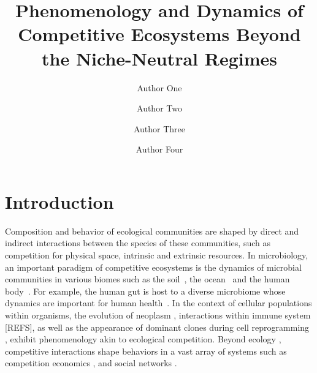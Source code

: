 \documentclass[9pt,twocolumn,twoside,lineno]{pnas-new}
\title{Phenomenology  and Dynamics of Competitive Ecosystems Beyond the Niche-Neutral Regimes }
\author[a,c,1]{Author One}
\author[b,1,2]{Author Two}
\author[a]{Author Three}
\author[a]{Author Four}
\affil[a]{Affiliation One}
\affil[b]{Affiliation Two}
\affil[c]{Affiliation Three}
\begin{document}
\maketitle
\thispagestyle{firststyle}


\maketitle

\section{Introduction}
\label{sec:introduction}

Composition and behavior of ecological communities are shaped by direct and indirect interactions between the species of these communities, such as competition for physical space, intrinsic and extrinsic resources. %
In microbiology, an important paradigm of competitive ecosystems is the dynamics of microbial communities in various biomes such as the soil~\cite{ratzke2020strength}, the ocean~\cite{tilman1977resource,strom2008microbial} and the human body~\cite{foster2017evolution}. 
For example, the human gut is host to a diverse microbiome whose dynamics are important for human health~\cite{coyte2015ecology,gorter2020understanding}. 
In the context of cellular populations within organisms,  the evolution of neoplasm \cite{merlo2006cancer,kareva2015cancer}, interactions within immune system [REFS], as well as the appearance of dominant clones during cell reprogramming \cite{shakiba2019cell}, exhibit phenomenology akin to ecological competition. 
Beyond ecology \cite{tilman1982resource,morin2009community,tuljapurkar2013population}, competitive interactions shape behaviors in a vast array of systems such as competition economics \cite{budzinski2007monoculture}, and social networks \cite{koura2017competitive}.
\end{document}
